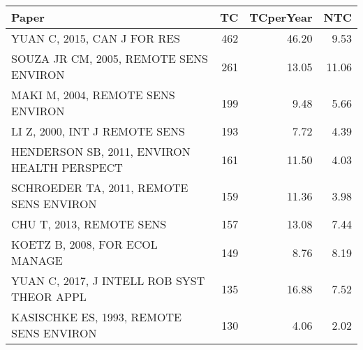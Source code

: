 
\begin{tabular}{lrrr}
\toprule
Paper & TC & TCperYear & NTC\\
\midrule
YUAN C, 2015, CAN J FOR RES & 462 & 46.20 & 9.53\\
SOUZA JR CM, 2005, REMOTE SENS ENVIRON & 261 & 13.05 & 11.06\\
MAKI M, 2004, REMOTE SENS ENVIRON & 199 & 9.48 & 5.66\\
LI Z, 2000, INT J REMOTE SENS & 193 & 7.72 & 4.39\\
HENDERSON SB, 2011, ENVIRON HEALTH PERSPECT & 161 & 11.50 & 4.03\\
\addlinespace
SCHROEDER TA, 2011, REMOTE SENS ENVIRON & 159 & 11.36 & 3.98\\
CHU T, 2013, REMOTE SENS & 157 & 13.08 & 7.44\\
KOETZ B, 2008, FOR ECOL MANAGE & 149 & 8.76 & 8.19\\
YUAN C, 2017, J INTELL ROB SYST THEOR APPL & 135 & 16.88 & 7.52\\
KASISCHKE ES, 1993, REMOTE SENS ENVIRON & 130 & 4.06 & 2.02\\
\bottomrule
\end{tabular}
